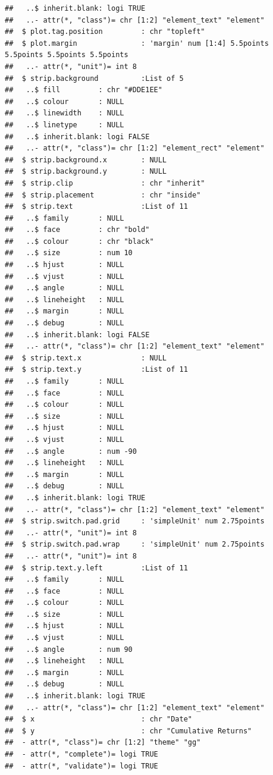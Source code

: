 \documentclass[12pt,preprint, authoryear]{elsarticle}
\numberwithin{equation}{section}
\numberwithin{figure}{section}
\numberwithin{table}{section}
\begin{document}
\begin{verbatim}
##   ..$ inherit.blank: logi TRUE
##   ..- attr(*, "class")= chr [1:2] "element_text" "element"
##  $ plot.tag.position         : chr "topleft"
##  $ plot.margin               : 'margin' num [1:4] 5.5points 5.5points 5.5points 5.5points
##   ..- attr(*, "unit")= int 8
##  $ strip.background          :List of 5
##   ..$ fill         : chr "#DDE1EE"
##   ..$ colour       : NULL
##   ..$ linewidth    : NULL
##   ..$ linetype     : NULL
##   ..$ inherit.blank: logi FALSE
##   ..- attr(*, "class")= chr [1:2] "element_rect" "element"
##  $ strip.background.x        : NULL
##  $ strip.background.y        : NULL
##  $ strip.clip                : chr "inherit"
##  $ strip.placement           : chr "inside"
##  $ strip.text                :List of 11
##   ..$ family       : NULL
##   ..$ face         : chr "bold"
##   ..$ colour       : chr "black"
##   ..$ size         : num 10
##   ..$ hjust        : NULL
##   ..$ vjust        : NULL
##   ..$ angle        : NULL
##   ..$ lineheight   : NULL
##   ..$ margin       : NULL
##   ..$ debug        : NULL
##   ..$ inherit.blank: logi FALSE
##   ..- attr(*, "class")= chr [1:2] "element_text" "element"
##  $ strip.text.x              : NULL
##  $ strip.text.y              :List of 11
##   ..$ family       : NULL
##   ..$ face         : NULL
##   ..$ colour       : NULL
##   ..$ size         : NULL
##   ..$ hjust        : NULL
##   ..$ vjust        : NULL
##   ..$ angle        : num -90
##   ..$ lineheight   : NULL
##   ..$ margin       : NULL
##   ..$ debug        : NULL
##   ..$ inherit.blank: logi TRUE
##   ..- attr(*, "class")= chr [1:2] "element_text" "element"
##  $ strip.switch.pad.grid     : 'simpleUnit' num 2.75points
##   ..- attr(*, "unit")= int 8
##  $ strip.switch.pad.wrap     : 'simpleUnit' num 2.75points
##   ..- attr(*, "unit")= int 8
##  $ strip.text.y.left         :List of 11
##   ..$ family       : NULL
##   ..$ face         : NULL
##   ..$ colour       : NULL
##   ..$ size         : NULL
##   ..$ hjust        : NULL
##   ..$ vjust        : NULL
##   ..$ angle        : num 90
##   ..$ lineheight   : NULL
##   ..$ margin       : NULL
##   ..$ debug        : NULL
##   ..$ inherit.blank: logi TRUE
##   ..- attr(*, "class")= chr [1:2] "element_text" "element"
##  $ x                         : chr "Date"
##  $ y                         : chr "Cumulative Returns"
##  - attr(*, "class")= chr [1:2] "theme" "gg"
##  - attr(*, "complete")= logi TRUE
##  - attr(*, "validate")= logi TRUE
\end{verbatim}
\end{document}
